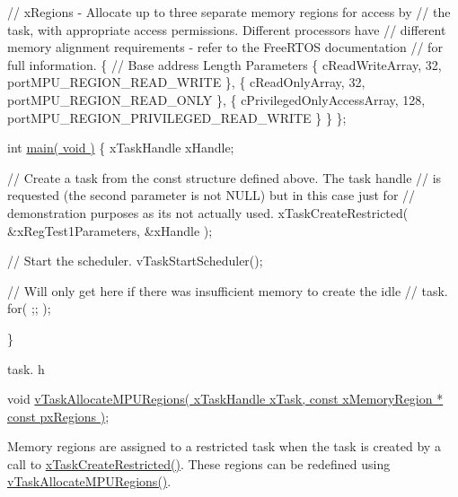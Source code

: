 \begin{DoxyPre}    // xRegions - Allocate up to three separate memory regions for access by
    // the task, with appropriate access permissions.  Different processors have
    // different memory alignment requirements - refer to the FreeRTOS documentation
    // for full information.
    \{
        // Base address                 Length  Parameters
        \{ cReadWriteArray,              32,     portMPU\_REGION\_READ\_WRITE \},
        \{ cReadOnlyArray,               32,     portMPU\_REGION\_READ\_ONLY \},
        \{ cPrivilegedOnlyAccessArray,   128,    portMPU\_REGION\_PRIVILEGED\_READ\_WRITE \}
    \}
\};\end{DoxyPre}



\begin{DoxyPre}int \hyperlink{MyFreeRTOSProject_8c_a840291bc02cba5474a4cb46a9b9566fe}{main( void )}
\{
xTaskHandle xHandle;
\begin{DoxyVerb}// Create a task from the const structure defined above.  The task handle
// is requested (the second parameter is not NULL) but in this case just for
// demonstration purposes as its not actually used.
xTaskCreateRestricted( &xRegTest1Parameters, &xHandle );

// Start the scheduler.
vTaskStartScheduler();

// Will only get here if there was insufficient memory to create the idle
// task.
for( ;; );
\end{DoxyVerb}

\}
   \end{DoxyPre}


task. h 
\begin{DoxyPre}
 void \hyperlink{task_8h_a4fd3da9cc010ebb08743f613763c7924}{vTaskAllocateMPURegions( xTaskHandle xTask, const xMemoryRegion * const pxRegions )};\end{DoxyPre}


Memory regions are assigned to a restricted task when the task is created by a call to \hyperlink{task_8h_a61b00cd623953f4f94fe794057d7f648}{x\+Task\+Create\+Restricted()}. These regions can be redefined using \hyperlink{task_8h_a4fd3da9cc010ebb08743f613763c7924}{v\+Task\+Allocate\+M\+P\+U\+Regions()}.


